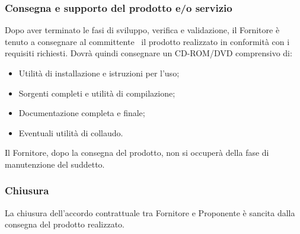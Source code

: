 \documentclass[../NormeDiProgetto.tex]{subfiles}
\begin{document}
			\subsubsection{Consegna e supporto del prodotto e/o servizio}
				Dopo aver terminato le fasi di sviluppo, verifica e validazione, il Fornitore è tenuto
				a consegnare al committente \vardanega\ il prodotto realizzato in conformità con i
				requisiti richiesti. Dovrà quindi consegnare un CD-ROM/DVD comprensivo di:
				\begin{itemize}
					\item Utilità di installazione e istruzioni per l'uso;
					\item Sorgenti completi e utilità di compilazione;
					\item Documentazione completa e finale;
					\item Eventuali utilità di collaudo.
				\end{itemize}
				Il Fornitore, dopo la consegna del prodotto, non si occuperà della fase di
				manutenzione del suddetto.
			\subsubsection{Chiusura}
				La chiusura dell'accordo contrattuale tra Fornitore e Proponente è sancita dalla
				consegna del prodotto realizzato.
\end{document}
